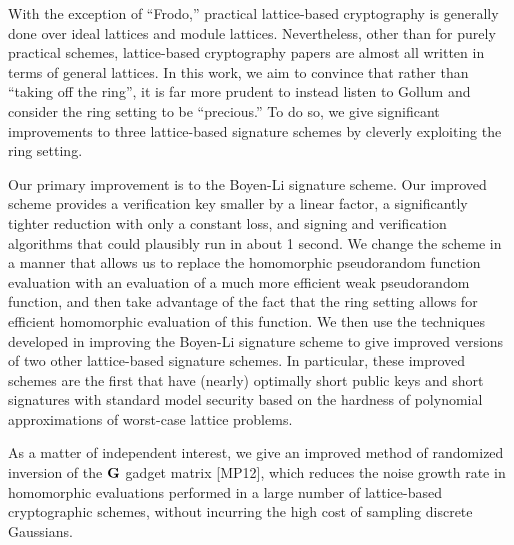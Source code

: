 With the exception of ``Frodo,'' practical lattice-based cryptography is generally done over ideal lattices and module lattices. Nevertheless, other than for purely practical schemes, lattice-based cryptography papers are almost all written in terms of general lattices.  In this work, we aim to convince that rather than ``taking off the ring'', it is far more prudent to instead listen to Gollum and consider the ring setting to be ``precious.'' To do so, we give significant improvements to three lattice-based signature schemes by cleverly exploiting the ring setting. 

Our primary improvement is to the Boyen-Li signature scheme. Our improved scheme provides a verification key smaller by a linear factor, a significantly tighter reduction with only a constant loss, and signing and verification algorithms that could plausibly run in about 1 second. We change the scheme in a manner that allows us to replace the homomorphic pseudorandom function evaluation with an evaluation of a much more efficient weak pseudorandom function, and then take advantage of the fact that the ring setting allows for efficient homomorphic evaluation of this function. We then use the techniques developed in improving the Boyen-Li signature scheme to give improved versions of two other lattice-based signature schemes. In particular, these improved schemes are the first that have (nearly) optimally short public keys and short signatures with standard model security based on the hardness of polynomial approximations of worst-case lattice problems.  

As a matter of independent interest, we give an improved method of randomized inversion of the $\mathbf{G}$ gadget matrix [MP12], which reduces the noise growth rate in homomorphic evaluations performed in a large number of lattice-based cryptographic schemes,  without incurring the high cost of sampling discrete Gaussians. 